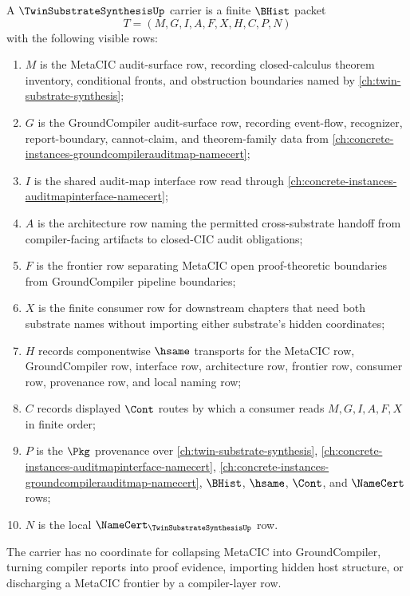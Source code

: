 \begin{definition}
\label{def:twin-substrate-synthesis-packet}
A $\TwinSubstrateSynthesisUp$ carrier is a finite $\BHist$ packet
$$
T=(M,G,I,A,F,X,H,C,P,N)
$$
with the following visible rows:
\begin{enumerate}
\item $M$ is the MetaCIC audit-surface row, recording closed-calculus theorem inventory, conditional fronts, and obstruction boundaries named by \autoref{ch:twin-substrate-synthesis};
\item $G$ is the GroundCompiler audit-surface row, recording event-flow, recognizer, report-boundary, cannot-claim, and theorem-family data from \autoref{ch:concrete-instances-groundcompilerauditmap-namecert};
\item $I$ is the shared audit-map interface row read through \autoref{ch:concrete-instances-auditmapinterface-namecert};
\item $A$ is the architecture row naming the permitted cross-substrate handoff from compiler-facing artifacts to closed-CIC audit obligations;
\item $F$ is the frontier row separating MetaCIC open proof-theoretic boundaries from GroundCompiler pipeline boundaries;
\item $X$ is the finite consumer row for downstream chapters that need both substrate names without importing either substrate's hidden coordinates;
\item $H$ records componentwise $\hsame$ transports for the MetaCIC row, GroundCompiler row, interface row, architecture row, frontier row, consumer row, provenance row, and local naming row;
\item $C$ records displayed $\Cont$ routes by which a consumer reads $M,G,I,A,F,X$ in finite order;
\item $P$ is the $\Pkg$ provenance over \autoref{ch:twin-substrate-synthesis}, \autoref{ch:concrete-instances-auditmapinterface-namecert}, \autoref{ch:concrete-instances-groundcompilerauditmap-namecert}, $\BHist$, $\hsame$, $\Cont$, and $\NameCert$ rows;
\item $N$ is the local $\NameCert_{\TwinSubstrateSynthesisUp}$ row.
\end{enumerate}
The carrier has no coordinate for collapsing MetaCIC into GroundCompiler, turning compiler reports into proof evidence, importing hidden host structure, or discharging a MetaCIC frontier by a compiler-layer row.
\end{definition}

